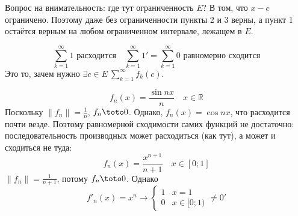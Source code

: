 \documentclass{article}
\begin{document}
    \begin{remark}
        Вопрос на внимательность: где тут ограниченность $E$? В том, что $x-c$ ограничено. Поэтому даже без ограниченности пункты 2 и 3 верны, а пункт 1 остаётся верным на любом ограниченном интервале, лежащем в $E$.
    \end{remark}
    \begin{example}
        $$
        \sum\limits_{k=1}^\infty1\text{ расходится}\quad\sum\limits_{k=1}^\infty1'=\sum\limits_{k=1}^\infty0\text{ равномерно сходится}
        $$
        Это то, зачем нужно $\exists c\in E~\sum\limits_{k=1}^\infty f_k(c)$.
    \end{example}
    \begin{example}
        $$
        f_n(x)=\frac{\sin nx}n\quad x\in\mathbb R
        $$
        Поскольку $\|f_n\|=\frac1n$, $f_n\toto0$. Однако, $f_n(x)=\cos nx$, что расходится почти везде. Поэтому равномерной сходимости самих функций не достаточно: последовательность производных может расходиться (как тут), а может и сходиться не туда:
        $$
        f_n(x)=\frac{x^{n+1}}{n+1}\quad x\in[0;1]
        $$
        $\|f_n\|=\frac1{n+1}$, потому $f_n\toto0$. Однако
        $$
        f'_n(x)=x^n\rightarrow\begin{cases}
            1 & x=1\\
            0 & x\in[0;1)
        \end{cases}\neq0'
        $$
    \end{example}
\end{document}

